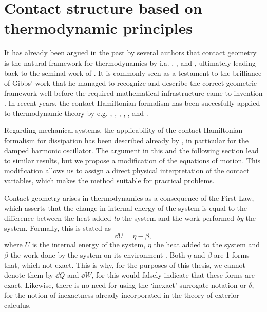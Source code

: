 \section{Contact structure based on thermodynamic principles}
\label{sec:thermodynamics}
It has already been argued in the past by several authors that contact geometry is the natural framework for thermodynamics by i.a. \citet{Arnold1991,Arnold1989a,Arnold1989,Arnold1989b}, \citet{Bamberg1988}, \citet{Burke1985} and \citet{Hermann1973}, ultimately leading back to the seminal work of \citet{Gibbs1873}. It is commonly seen as a testament to the brilliance of Gibbs' work that he managed to recognize and describe the correct geometric framework well before the required mathematical infrastructure came to invention \cite{Wightman1979}. In recent years, the contact Hamiltonian formalism has been succesfully applied to thermodynamic theory by e.g. \citet{Mrugala1991,Mrugala2000,Mrugala1984,Mrugala1985,Mrugala1993,Mrugala1996}, \citet{Balian2001}, \citet{VanderSchaft2021a,VanderSchaft2018}, \citet{Maschke2018}, \citet{Bravetti2015}, and \citet{Simoes2020}. 

Regarding mechanical systems, the applicability of the contact Hamiltonian formalism for dissipation has been described already by \citet{Bravetti2017}, in particular for the damped harmonic oscillator. The argument in this and the following section lead to similar results, but we propose a modification of the equations of motion. This modification allows us to assign a direct physical interpretation of the contact variables, which makes the method suitable for practical problems.

Contact geometry arises in thermodynamics as a consequence of the First Law, which asserts that the change in internal energy of the system is equal to the difference between the heat added \emph{to} the system and the work performed \emph{by} the system. Formally, this is stated as
\begin{equation}
    \dd{U} = \eta - \beta,
    \label{eq:thermo_first_law}
\end{equation}
where $U$ is the internal energy of the system, $\eta$ the heat added to the system and $\beta$ the work done by the system on its environment \cite{Bamberg1988,Frankel2012}. Both $\eta$ and $\beta$ are 1-forms that, which not exact. This is why, for the purposes of this thesis, we cannot denote them by $\dd{Q}$ and  $\dd{W}$, for this would falsely indicate that these forms are exact. Likewise, there is no need for using the `inexact' surrogate notation \dj\xspace or $\delta$, for the notion of inexactness already incorporated in the theory of exterior calculus. 


